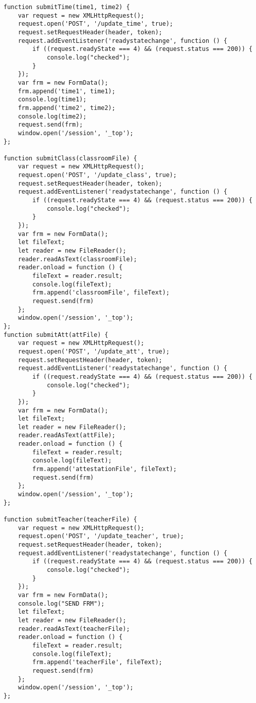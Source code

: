 \begin{lstlisting}
function submitTime(time1, time2) {
	var request = new XMLHttpRequest();
	request.open('POST', '/update_time', true);
	request.setRequestHeader(header, token);
	request.addEventListener('readystatechange', function () {
		if ((request.readyState === 4) && (request.status === 200)) {
			console.log("checked");
		}
	});
	var frm = new FormData();
	frm.append('time1', time1);
	console.log(time1);
	frm.append('time2', time2);
	console.log(time2);
	request.send(frm);
	window.open('/session', '_top');
};

function submitClass(classroomFile) {
	var request = new XMLHttpRequest();
	request.open('POST', '/update_class', true);
	request.setRequestHeader(header, token);
	request.addEventListener('readystatechange', function () {
		if ((request.readyState === 4) && (request.status === 200)) {
			console.log("checked");
		}
	});
	var frm = new FormData();
	let fileText;
	let reader = new FileReader();
	reader.readAsText(classroomFile);
	reader.onload = function () {
		fileText = reader.result;
		console.log(fileText);
		frm.append('classroomFile', fileText);
		request.send(frm)
	};
	window.open('/session', '_top');
};
function submitAtt(attFile) {
	var request = new XMLHttpRequest();
	request.open('POST', '/update_att', true);
	request.setRequestHeader(header, token);
	request.addEventListener('readystatechange', function () {
		if ((request.readyState === 4) && (request.status === 200)) {
			console.log("checked");
		}
	});
	var frm = new FormData();
	let fileText;
	let reader = new FileReader();
	reader.readAsText(attFile);
	reader.onload = function () {
		fileText = reader.result;
		console.log(fileText);
		frm.append('attestationFile', fileText);
		request.send(frm)
	};
	window.open('/session', '_top');
};

function submitTeacher(teacherFile) {
	var request = new XMLHttpRequest();
	request.open('POST', '/update_teacher', true);
	request.setRequestHeader(header, token);
	request.addEventListener('readystatechange', function () {
		if ((request.readyState === 4) && (request.status === 200)) {
			console.log("checked");
		}
	});
	var frm = new FormData();
	console.log("SEND FRM");
	let fileText;
	let reader = new FileReader();
	reader.readAsText(teacherFile);
	reader.onload = function () {
		fileText = reader.result;
		console.log(fileText);
		frm.append('teacherFile', fileText);
		request.send(frm)
	};
	window.open('/session', '_top');
};


\end{lstlisting}
